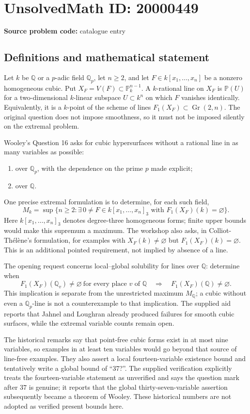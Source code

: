 \documentclass[11pt]{article}
\newcommand{\Q}{\mathbb{Q}}
\newcommand{\PP}{\mathbb{P}}
\begin{document}
\section*{UnsolvedMath ID: 20000449}
\textbf{Source problem code:} catalogue entry
\subsection{Definitions and mathematical statement}
Let \(k\) be \(\Q\) or a \(p\)-adic field \(\Q_p\), let \(n\geq2\), and let \(F\in k[x_1,\ldots,x_n]\) be a nonzero homogeneous cubic. Put \(X_F=V(F)\subset\PP^{n-1}_k\). A \(k\)-rational line on \(X_F\) is \(\PP(U)\) for a two-dimensional \(k\)-linear subspace \(U\subset k^n\) on which \(F\) vanishes identically. Equivalently, it is a \(k\)-point of the scheme of lines \(F_1(X_F)\subset\operatorname{Gr}(2,n)\). The original question does not impose smoothness, so it must not be imposed silently on the extremal problem.

Wooley's Question 16 asks for cubic hypersurfaces without a rational line in as many variables as possible:
\begin{enumerate}
\item over \(\Q_p\), with the dependence on the prime \(p\) made explicit;
\item over \(\Q\).
\end{enumerate}
One precise extremal formulation is to determine, for each such field,
\[
M_k=\sup\{n\geq2:\exists\,0\ne F\in k[x_1,\ldots,x_n]_3
\text{ with }F_1(X_F)(k)=\varnothing\}.
\]
Here \(k[x_1,\ldots,x_n]_3\) denotes degree-three homogeneous forms; finite upper bounds would make this supremum a maximum. The workshop also asks, in Colliot-Th\'el\`ene's formulation, for examples with \(X_F(k)\ne\varnothing\) but \(F_1(X_F)(k)=\varnothing\). This is an additional pointed requirement, not implied by absence of a line.

The opening request concerns local--global solubility for lines over \(\Q\): determine when
\[
F_1(X_F)(\Q_v)\ne\varnothing\ \text{for every place }v\text{ of }\Q
\quad\Longrightarrow\quad F_1(X_F)(\Q)\ne\varnothing.
\]
This implication is separate from the unrestricted maximum \(M_\Q\); a cubic without even a \(\Q_p\)-line is not a counterexample to that implication. The supplied aid reports that Jahnel and Loughran already produced failures for smooth cubic surfaces, while the extremal variable counts remain open.

The historical remarks say that point-free cubic forms exist in at most nine variables, so examples in at least ten variables would go beyond that source of line-free examples. They also assert a local fourteen-variable existence bound and tentatively write a global bound of ``37?''. The supplied verification explicitly treats the fourteen-variable statement as unverified and says the question mark after \(37\) is genuine; it reports that the global thirty-seven-variable assertion subsequently became a theorem of Wooley. These historical numbers are not adopted as verified present bounds here.
\end{document}
